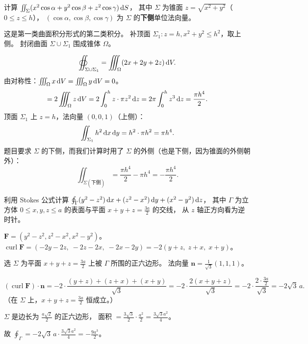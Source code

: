 \documentclass{article}
\DeclareMathOperator{\curl}{curl}
\begin{document}
\begin{exercise}[综合——Gauss 补面]
  计算 $\iint_\Sigma (x^2\cos\alpha + y^2\cos\beta + z^2\cos\gamma) \,\mathrm{d} S$，
  其中 $\Sigma$ 为锥面 $z = \sqrt{x^2+y^2}$（$0 \le z \le h$），
  $(\cos\alpha, \cos\beta, \cos\gamma)$ 为 $\Sigma$ 的\textbf{下侧}单位法向量。
\end{exercise}

\begin{solution}
  这是第一类曲面积分形式的第二类积分。
  补顶面 $\Sigma_1: z = h, x^2+y^2 \le h^2$，取上侧。
  封闭曲面 $\Sigma \cup \Sigma_1$ 围成锥体 $\Omega$。

  \[
    \oiint_{\Sigma\cup\Sigma_1} = \iiint_\Omega (2x+2y+2z) \,\mathrm{d} V.
  \]
  由对称性：$\iiint_\Omega x \,\mathrm{d} V = \iiint_\Omega y \,\mathrm{d} V = 0$。
  \[
    = 2\iiint_\Omega z \,\mathrm{d} V = 2\int_0^h z \cdot \pi z^2 \,\mathrm{d} z
    = 2\pi \int_0^h z^3 \,\mathrm{d} z = \frac{\pi h^4}{2}.
  \]
  顶面 $\Sigma_1$ 上 $z = h$，法向量 $(0,0,1)$（上侧）：
  \[
    \iint_{\Sigma_1} h^2 \,\mathrm{d} x\,\mathrm{d} y = h^2 \cdot \pi h^2 = \pi h^4.
  \]
  题目要求 $\Sigma$ 的下侧，而我们计算时用了 $\Sigma$ 的外侧（也是下侧，因为锥面的外侧朝外）：
  \[
    \iint_{\Sigma(\text{下侧})} = \frac{\pi h^4}{2} - \pi h^4 =
    -\frac{\pi h^4}{2}.
  \]
\end{solution}

\begin{exercise}
  利用 Stokes 公式计算 $\oint_\Gamma (y^2-z^2)\,\mathrm{d} x + (z^2-x^2)\,\mathrm{d} y
  + (x^2-y^2)\,\mathrm{d} z$，
  其中 $\Gamma$ 为立方体 $0 \le x,y,z \le a$ 的表面与平面 $x+y+z = \frac{3a}{2}$ 的交线，
  从 $z$ 轴正方向看为逆时针。
\end{exercise}

\begin{solution}
  $\mathbf{F} = (y^2-z^2, z^2-x^2, x^2-y^2)$。
  $\curl\mathbf{F} = (-2y-2z,\; -2z-2x,\; -2x-2y) = -2(y+z,\; z+x,\; x+y)$。

  选 $\Sigma$ 为平面 $x+y+z = \frac{3a}{2}$ 上被 $\Gamma$ 所围的正六边形。
  法向量 $\mathbf{n} = \frac{1}{\sqrt{3}}(1,1,1)$。

  \[
    (\curl\mathbf{F})\cdot\mathbf{n} = -2\cdot\frac{(y+z)+(z+x)+(x+y)}{\sqrt{3}}
    = -2\cdot\frac{2(x+y+z)}{\sqrt{3}}
    = -2\cdot\frac{2\cdot\frac{3a}{2}}{\sqrt{3}}
    = -2\sqrt{3}\,a.
  \]
  （在 $\Sigma$ 上，$x+y+z = \frac{3a}{2}$ 恒成立。）

  $\Sigma$ 是边长为 $\frac{a\sqrt{2}}{2}$ 的正六边形，
  面积 $= \frac{3\sqrt{3}}{2}\cdot\frac{a^2}{2} = \frac{3\sqrt{3}a^2}{4}$。

  故 $\oint_\Gamma = -2\sqrt{3}\,a\cdot\frac{3\sqrt{3}a^2}{4}
  = -\frac{9a^3}{2}$。
\end{solution}
\end{document}
